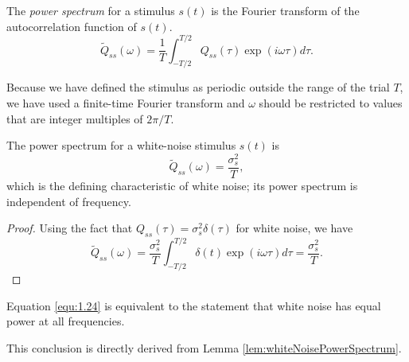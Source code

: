 \begin{defn}
  \label{defn:power-spectrum}
  The \emph{power spectrum} for a stimulus $s(t)$ is the Fourier transform of the autocorrelation function of $s(t)$.
  \begin{equation}
    \label{equ:1.40}
    \widetilde{Q}_{ss}(\omega) = \frac{1}{T} \int_{-T/2}^{T/2}Q_{ss}(\tau)\exp(i\omega\tau) d\tau.
  \end{equation}
\end{defn}

\begin{rem}
  Because we have defined the stimulus as periodic outside the range of the trial $T$, we have used a finite-time Fourier transform and $\omega$ should be restricted to values that are integer multiples of $2\pi / T$.
\end{rem}

\begin{lem}
  \label{lem:whiteNoisePowerSpectrum}
  The power spectrum for a white-noise stimulus $s(t)$ is
  \begin{equation}
    \label{equ:1.41}
    \widetilde{Q}_{ss}(\omega) = \frac{\sigma_s^2}{T},
  \end{equation}
  which is the defining characteristic of white noise; its power spectrum is independent of frequency.
\end{lem}
\begin{proof}
  Using the fact that $Q_{ss}(\tau) = \sigma_s^2\delta(\tau)$ for white noise, we have
  \begin{displaymath}
    \widetilde{Q}_{ss}(\omega) = \frac{\sigma_s^2}{T} \int_{-T/2}^{T/2}\delta(t)\exp(i\omega\tau) d\tau = \frac{\sigma_s^2}{T}.
  \end{displaymath}
\end{proof}

\begin{prop}
  \label{prop:equivalence}
  Equation \ref{equ:1.24} is equivalent to the statement that white noise has equal power at all frequencies.
\end{prop}
\begin{solution}
  This conclusion is directly derived from Lemma \ref{lem:whiteNoisePowerSpectrum}.
\end{solution}

